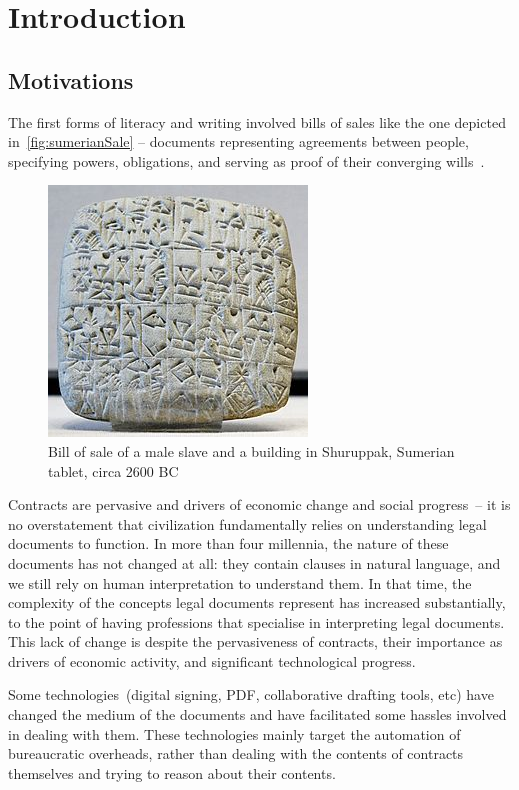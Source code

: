 \chapter{Introduction}\label{ch:introduction}


\section{Motivations}\label{sec:problem-relevance}

The first forms of literacy and writing involved bills of sales like the one depicted in~\autoref{fig:sumerianSale} -- documents representing agreements between people, specifying powers, obligations, and serving as proof of their converging wills~\cite{larsonContractLawIntro}.


\begin{figure}[h]
    \centering
    \includegraphics[width=0.4\columnwidth]{figures/sumerianSales}
    \caption{Bill of sale of a male slave and a building in Shuruppak, Sumerian tablet, circa 2600 BC}
    \label{fig:sumerianSale}
\end{figure}

Contracts are pervasive and drivers of economic change and social progress~-- it is no overstatement that civilization fundamentally relies on understanding legal documents to function.
In more than four millennia, the nature of these documents has not changed at all: they contain clauses in natural language, and we still rely on human interpretation to understand them.
In that time, the complexity of the concepts legal documents represent has increased substantially, to the point of having professions that specialise in interpreting legal documents.
This lack of change is despite the pervasiveness of contracts, their importance as drivers of economic activity, and significant technological progress.

Some technologies~(digital signing, PDF, collaborative drafting tools, etc) have changed the medium of the documents and have facilitated some hassles involved in dealing with them.
These technologies mainly target the automation of bureaucratic overheads, rather than dealing with the contents of contracts themselves and trying to reason about their contents.

